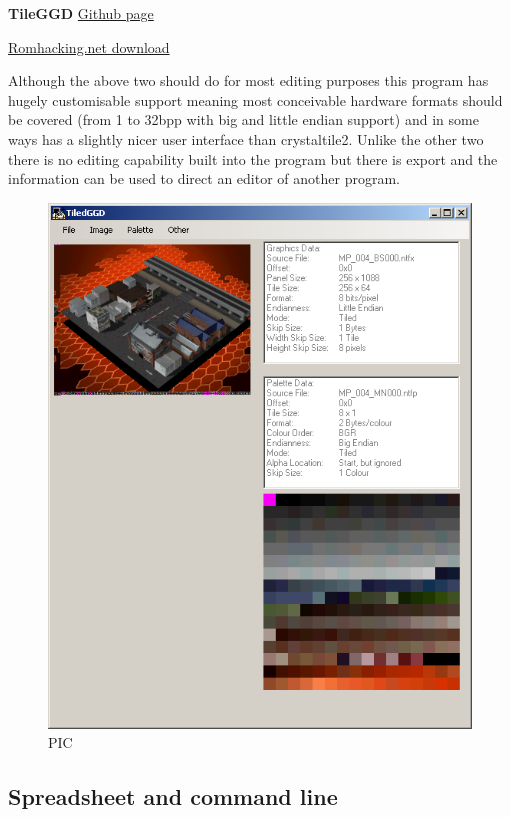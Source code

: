 \documentclass[
]{book}
\begin{document}
\textbf{TileGGD} \href{https://github.com/barubary/tiledggd}{Github page}

\href{http://www.romhacking.net/utilities/646/}{Romhacking.net download}

Although the above two should do for most editing purposes this program has hugely customisable support meaning most conceivable hardware formats should be covered (from 1 to 32bpp with big and little endian support) and in some ways has a slightly nicer user interface than crystaltile2. Unlike the other two there is no editing capability built into the program but there is export and the information can be used to direct an editor of another program.

\begin{figure}
\centering
\includegraphics{images/15_home_fast6191_romhackingguide_unrenamed_file___romhackingguidetileeeditorsshowcasetileggd1.png}
\caption{PIC}
\end{figure}

\hypertarget{spreadsheet-and-command-line}{%
\subsection{Spreadsheet and command line}\label{spreadsheet-and-command-line}}
\end{document}
